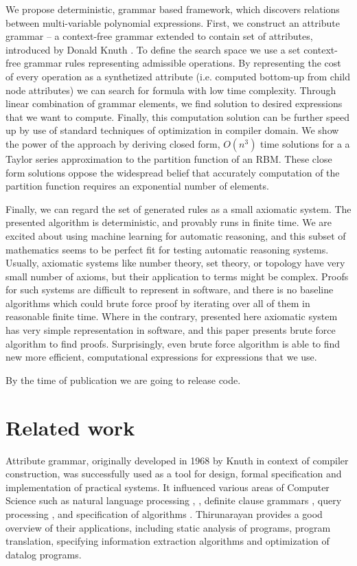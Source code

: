 \documentclass{article}
\begin{document}
We propose deterministic, grammar based framework, which discovers relations between
multi-variable polynomial expressions. First, we construct an attribute grammar
-- a context-free grammar extended to contain set of attributes, introduced by
Donald Knuth \cite{knuth1968semantics}. To define the search space we use a set
context-free grammar rules representing admissible operations. By representing
the cost of every operation as a synthetized attribute (i.e. computed bottom-up from child node attributes)
we can search for formula with low time complexity.
Through linear combination of grammar elements, we find solution to desired 
expressions that we want to compute. Finally, this computation solution can be further speed up by use of standard
techniques of optimization in compiler domain. We show the power of the
approach by deriving closed form, $O(n^3)$ time solutions for a 
a Taylor series approximation to the partition
function of an RBM. These close form solutions oppose
the widespread belief that accurately computation of the partition function requires
an exponential number of elements.


Finally, we can regard the set of generated rules as a small axiomatic system.
The presented algorithm is deterministic, and provably runs in finite
time. We are excited about using machine learning for automatic reasoning, and
this subset of mathematics seems to be perfect fit for testing automatic reasoning systems.
Usually, axiomatic systems like number theory, set theory, or topology have very small
number of axioms, but their application to terms might be complex. Proofs
for such systems are difficult to represent in software, and there is no
baseline algorithms which could brute force proof by iterating over all of them in reasonable finite time.
Where in the contrary, presented here axiomatic system has very simple representation
in software, and this paper presents brute force algorithm to find proofs. 
Surprisingly, even brute force algorithm is able to find new more efficient,
computational expressions for expressions that we use.

By the time of publication we are going to release code.


\section{Related work} \label{relatedwork}


Attribute grammar, originally developed in 1968 by Knuth \cite{knuth1968semantics} in context of compiler
construction, was successfully used as a tool for design, formal specification
and implementation of practical systems. It influenced various areas of
Computer Science such as natural language processing \cite{hafiz2011modular}, \cite{starkie2002inferring}, 
definite clause grammars \cite{bratko2001prolog}, query processing \cite{koch2007attribute}, \cite{ramakrishnan1991top} and specification of algorithms \cite{bellanova1984examples}.
Thirunarayan \cite{thirunarayan2009attribute} provides a good overview of their
applications, including static analysis of programs, program translation, specifying information
extraction algorithms and optimization of datalog programs.
\end{document}
